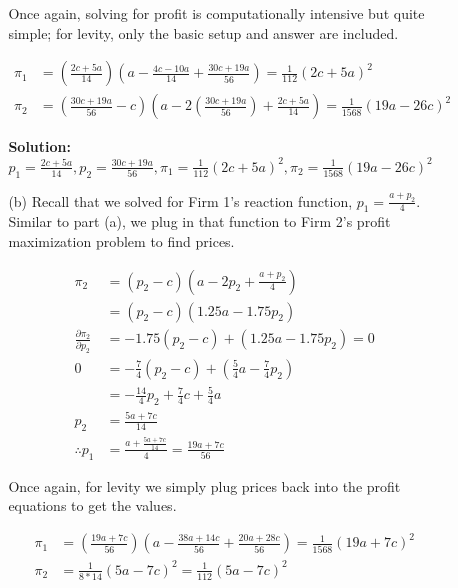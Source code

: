 \documentclass[12pt,letterpaper]{article}
\begin{document}
\begin{enumerate}
\begin{enumerate}
\begin{enumerate}
    Once again, solving for profit is computationally intensive but quite simple; for levity, only the basic setup and answer are included.

    \begin{align*}
        \pi_1 &= (\frac{2c + 5a}{14})(a - \frac{4c-10a}{14} + \frac{30c + 19a}{56}) = \frac{1}{112}(2c + 5a)^2 \\
        \pi_2 &= (\frac{30c + 19a}{56} -c)(a - 2(\frac{30c + 19a}{56}) + \frac{2c + 5a}{14}) = \frac{1}{1568}(19a - 26c)^2
    \end{align*}

    {\color{blue}\textbf{Solution:} $p_1 = \frac{2c + 5a}{14}, p_2 = \frac{30c + 19a}{56}, \pi_1 = \frac{1}{112}(2c + 5a)^2, \pi_2 = \frac{1}{1568}(19a - 26c)^2$}

    \item[(b)] Recall that we solved for Firm 1's reaction function, $p_1 = \frac{a + p_2}{4}$. Similar to part (a), we plug in that function to Firm 2's profit maximization problem to find prices.
    
    \begin{align*}
        \pi_2 &= (p_2 - c)(a - 2p_2 + \frac{a + p_2}{4}) \\
        &= (p_2 - c)(1.25a - 1.75p_2) \\
        \frac{\partial \pi_2}{\partial p_2} &= -1.75(p_2 - c) + (1.25a - 1.75p_2) = 0 \\
        0 &= -\frac{7}{4} (p_2 -c) + (\frac{5}{4} a - \frac{7}{4} p_2) \\
        &= -\frac{14}{4} p_2 + \frac{7}{4} c + \frac{5}{4} a \\
        p_2 &= \frac{5a + 7c}{14} \\
        \therefore p_1 &= \frac{a + \frac{5a + 7c}{14}}{4} = \frac{19a + 7c}{56}
    \end{align*}

    Once again, for levity we simply plug prices back into the profit equations to get the values.

    \begin{align*}
        \pi_1 &= (\frac{19a + 7c}{56})(a - \frac{38a + 14c}{56} + \frac{20a + 28c}{56}) = \frac{1}{1568}(19a + 7c)^2 \\
        \pi_2 &= \frac{1}{8*14}(5a-7c)^2 = \frac{1}{112}(5a-7c)^2
    \end{align*}


\end{enumerate}
\end{enumerate}
\end{enumerate}
\end{document}
